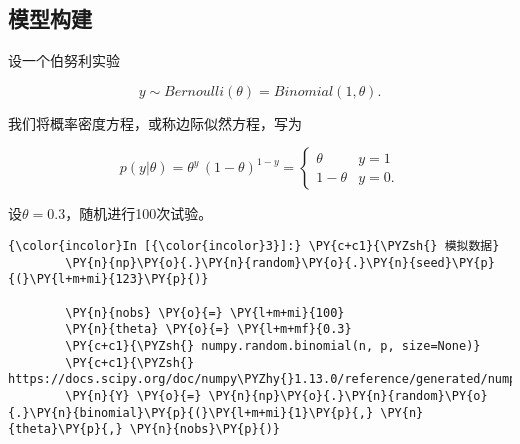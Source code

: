 %

\subsection{模型构建}
\label{ux6a21ux578bux6784ux5efa}
设一个伯努利实验

\begin{equation}
y \sim Bernoulli(\theta) = Binomial(1,\theta).
\end{equation}

我们将概率密度方程，或称边际似然方程，写为

\begin{equation}
p(y|\theta) = \theta^{y} \, \left(1-\theta \right)^{1-y} = \begin{cases}
\theta & y = 1 \\
1 - \theta & y = 0.
\end{cases}
\end{equation}

设\(\theta = 0.3\)，随机进行100次试验。

    \begin{Verbatim}[commandchars=\\\{\}]
{\color{incolor}In [{\color{incolor}3}]:} \PY{c+c1}{\PYZsh{} 模拟数据}
        \PY{n}{np}\PY{o}{.}\PY{n}{random}\PY{o}{.}\PY{n}{seed}\PY{p}{(}\PY{l+m+mi}{123}\PY{p}{)}

        \PY{n}{nobs} \PY{o}{=} \PY{l+m+mi}{100}
        \PY{n}{theta} \PY{o}{=} \PY{l+m+mf}{0.3}
        \PY{c+c1}{\PYZsh{} numpy.random.binomial(n, p, size=None)}
        \PY{c+c1}{\PYZsh{} https://docs.scipy.org/doc/numpy\PYZhy{}1.13.0/reference/generated/numpy.random.binomial.html}
        \PY{n}{Y} \PY{o}{=} \PY{n}{np}\PY{o}{.}\PY{n}{random}\PY{o}{.}\PY{n}{binomial}\PY{p}{(}\PY{l+m+mi}{1}\PY{p}{,} \PY{n}{theta}\PY{p}{,} \PY{n}{nobs}\PY{p}{)}
\end{Verbatim}

